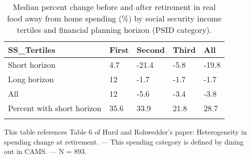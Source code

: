 \begin{table}[tbp] \centering
{}

\caption{Median percent change before and after retirement in real food away from home spending (\%) by social security income tertiles and financial planning horizon (PSID category).}
\begin{tabularx}{\textwidth}{lCCCC}

\toprule
{SS\_Tertiles}&{First}&{Second}&{Third}&{All} \tabularnewline
\midrule\addlinespace[1.5ex]
Short horizon&4.7&-21.4&-5.8&-19.8 \tabularnewline
Long horizon&12&-1.7&-1.7&-1.7 \tabularnewline
All&12&-5.6&-3.4&-3.8 \tabularnewline
Percent with short horizon&35.6&33.9&21.8&28.7 \tabularnewline
\bottomrule \addlinespace[1.5ex]

\end{tabularx}
\begin{flushleft}
\footnotesize This table references Table 6 of Hurd and Rohwedder's paper: Heterogeneity in spending change at retirement. \linebreak --- \linebreak This spending category is defined by dining out in CAMS. \linebreak --- \linebreak N = 893.
\end{flushleft}
\end{table}
